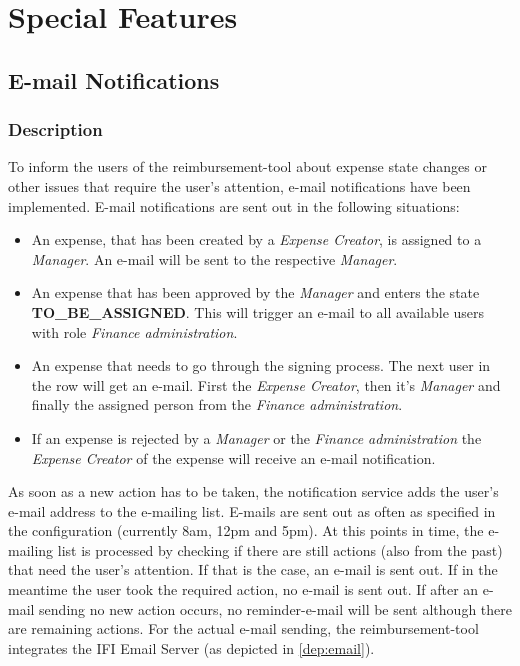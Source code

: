 \section{Special Features}

\subsection{E-mail Notifications}
\label{feature:notification}

\subsubsection{Description}
To inform the users of the reimbursement-tool about expense state changes or other issues that require the user's attention, e-mail notifications have been implemented.
E-mail notifications are sent out in the following situations:
\begin{itemize}
	\item An expense, that has been created by a \textit{Expense Creator}, is assigned to a \textit{Manager}. An e-mail will be sent to the respective \textit{Manager}.
	\item An expense that has been approved by the \textit{Manager} and enters the state \newline \textbf{TO\_BE\_ASSIGNED}. This will trigger an e-mail to all available users with role \textit{Finance administration}.
	\item An expense that needs to go through the signing process. The next user in the row will get an e-mail. First the \textit{Expense Creator}, then it's \textit{Manager} and finally the assigned person from the \textit{Finance administration}.
	\item If an expense is rejected by a \textit{Manager} or the \textit{Finance administration} the \textit{Expense Creator} of the expense will receive an e-mail notification.
\end{itemize}

As soon as a new action has to be taken, the notification service adds the user's e-mail address to the e-mailing list. E-mails are sent out as often as specified in the configuration (currently 8am, 12pm and 5pm). At this points in time, the e-mailing list is processed by checking if there are still actions (also from the past) that need the user's attention. If that is the case, an e-mail is sent out. If in the meantime the user took the required action, no e-mail is sent out. If after an e-mail sending no new action occurs, no reminder-e-mail will be sent although there are remaining actions. For the actual e-mail sending, the reimbursement-tool integrates the IFI Email Server (as depicted in \ref{dep:email}).

